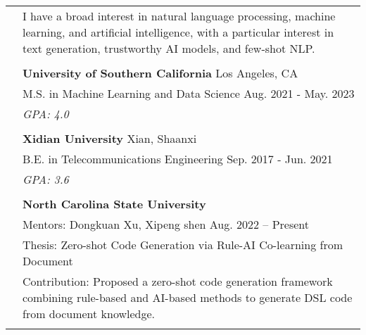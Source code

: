 \documentclass[letterpaper, 11pt]{article}
\begin{document}
\begin{longtable}{p{1.3in}p{4.8in}}


\nohyphens{\color{black}{Research interests}}
& I have a broad interest in natural language processing, machine learning, and artificial intelligence, with a particular interest in text generation, trustworthy AI models, and few-shot NLP. \\
& \\


\color{black}{Education} 

& \textbf{University of Southern California} \hfill Los Angeles, CA \\
& M.S. in Machine Learning and Data Science \hfill Aug. 2021 - May. 2023\\
& {\it GPA: 4.0}\\
& \\

& \textbf{Xidian University} \hfill Xian, Shaanxi\\
& B.E. in Telecommunications Engineering \hfill Sep. 2017 - Jun. 2021 \\
& {\it GPA: 3.6}\\
& \\





\nohyphens{\color{black}{Research experience}} 
& \textbf{North Carolina State University} \\
& Mentors: Dongkuan Xu, Xipeng shen \hfill Aug. 2022 -- Present \\
& Thesis: Zero-shot Code Generation via Rule-AI Co-learning from Document \\
& Contribution: Proposed a zero-shot code generation framework combining rule-based and AI-based methods to generate DSL code from document knowledge.\\
& \\


\end{longtable}
\end{document}
